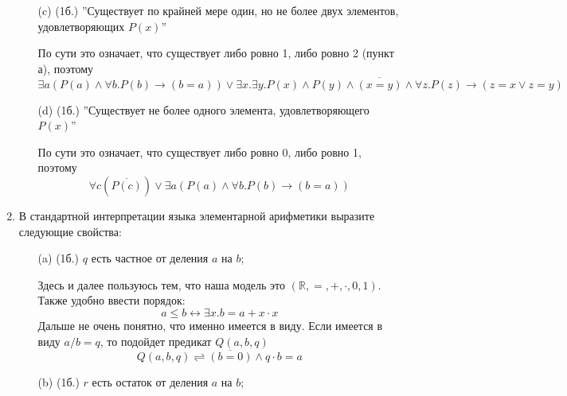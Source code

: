 \begin{enumerate}
\begin{itemize}
\begin{solution}
        \end{solution}
        \item[(c)] (1б.) ”Существует по крайней мере один, но не более двух элементов, удовлетворяющих $P(x)$”
        \begin{solution}
            По сути это означает, что существует либо ровно 1, либо ровно 2 (пункт а), поэтому
            \begin{equation}
                \exists a(P(a) \land \forall b. P(b) \rightarrow (b = a)) \lor \exists x. \exists y. P(x) \land P(y) \land \overline{(x=y)} \land \forall z. P(z) \rightarrow (z = x \lor z = y)
            \end{equation}
        \end{solution}
        \item[(d)] (1б.) ”Существует не более одного элемента, удовлетворяющего $P(x)$”
        \begin{solution}
            По сути это означает, что существует либо ровно 0, либо ровно 1, поэтому
            \begin{equation}
                \forall c(\overline{P(c)}) \lor \exists a(P(a) \land \forall b. P(b) \rightarrow (b = a))
            \end{equation}
        \end{solution}
    \end{itemize}
    \item В стандартной интерпретации языка элементарной арифметики выразите следующие свойства:
    \begin{itemize}
        \item[(a)] (1б.) $q$ есть частное от деления $a$ на $b$;
        \begin{solution}
            Здесь и далее пользуюсь тем, что наша модель это $(\mathbb{R}, =, +, \cdot, 0, 1)$. Также удобно ввести порядок:
            \begin{equation}
                a \leq b \leftrightarrow \exists x. b = a + x \cdot x
            \end{equation}
            Дальше не очень понятно, что именно имеется в виду. Если имеется в виду $a/b = q$, то подойдет предикат $Q(a,b,q)$
            \begin{equation}
                Q(a,b,q) \rightleftharpoons \overline{(b=0)} \land q \cdot b = a
            \end{equation}
        \end{solution}
        \item[(b)] (1б.) $r$ есть остаток от деления $a$ на $b$;

\end{itemize}
\end{enumerate}
